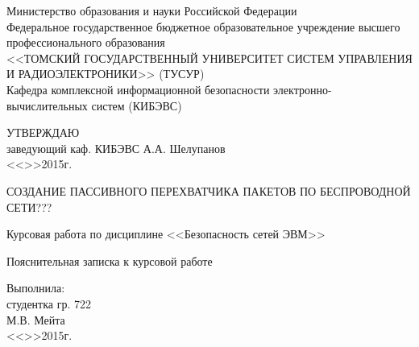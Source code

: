 \newpage
{}

\begin{center}
 Министерство образования и науки Российской Федерации\\
 Федеральное государственное бюджетное образовательное учреждение высшего профессионального образования\\
 <<ТОМСКИЙ ГОСУДАРСТВЕННЫЙ УНИВЕРСИТЕТ СИСТЕМ УПРАВЛЕНИЯ И РАДИОЭЛЕКТРОНИКИ>> (ТУСУР)\\
 Кафедра комплексной информационной безопасности электронно-вычислительных систем (КИБЭВС)\\
\end{center}

\vfill

\begin{flushright}
\begin{minipage}{0.45\textwidth}
 \begin{flushleft}
  УТВЕРЖДАЮ\\
  заведующий каф. КИБЭВС
  \underline{\hspace{3cm}}А.А. Шелупанов \\
  <<\underline{\hspace{1cm}}>>\underline{\hspace{3cm}}2015г.\\
 \end{flushleft}
\end{minipage}
\end{flushright}

\vfill

\begin{center}
СОЗДАНИЕ ПАССИВНОГО ПЕРЕХВАТЧИКА ПАКЕТОВ ПО БЕСПРОВОДНОЙ СЕТИ???

Курсовая работа по дисциплине <<Безопасность сетей ЭВМ>>

Пояснительная записка к курсовой работе
\end{center}

\vfill
\begin{flushright}
\begin{minipage}{0.45\textwidth}
 \begin{flushleft}
  Выполнила: \\
  студентка гр. 722 \\
  \underline{\hspace{3cm}}М.В. Мейта \\
  <<\underline{\hspace{1cm}}>>\underline{\hspace{3cm}}2015г.\\
 \end{flushleft}
\end{minipage}
\end{flushright}


